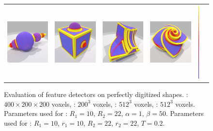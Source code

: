 \begin{figure}[ht]
\begin{center}
\begin{tabular}{l c c c cl}
      \includegraphics[width=4.0cm]{images/Feature/SphereSphereSphere_VCM_r_22} &
      \includegraphics[width=4.0cm]{images/Feature/CubeSphere_VCM_r_22} &
      \includegraphics[width=4.0cm]{images/Feature/Fandisk_VCM_r_22} &
      \includegraphics[width=4.0cm]{images/Feature/OctaFlower_512_VCM_r_22} &
      \includegraphics[width=0.1cm,height=4cm]{images/YMTB6W}
    \end{tabular}
    \caption[Evaluation of feature detectors on perfectly digitized shapes.]{Evaluation of feature detectors on perfectly digitized shapes.
    \SpheresUnion : $400 \times 200 \times 200$ voxels, \CubeSphere : $200^3$ voxels, \Fandisk : $512^3$ voxels, \OctaFlower : $512^3$ voxels.
    Parameters used for \cite{Telea2004}: $R_1 = 10$, $R_2 = 22$, $\alpha = 1$, $\beta = 50$.
    Parameters used for \cite{Merigot2011}: $R_1 = 10$, $r_1 = 10$, $R_2 = 22$, $r_2 = 22$, $T = 0.2$.\label{fig:feature-comparative}}
  \end{center}
\end{figure}
